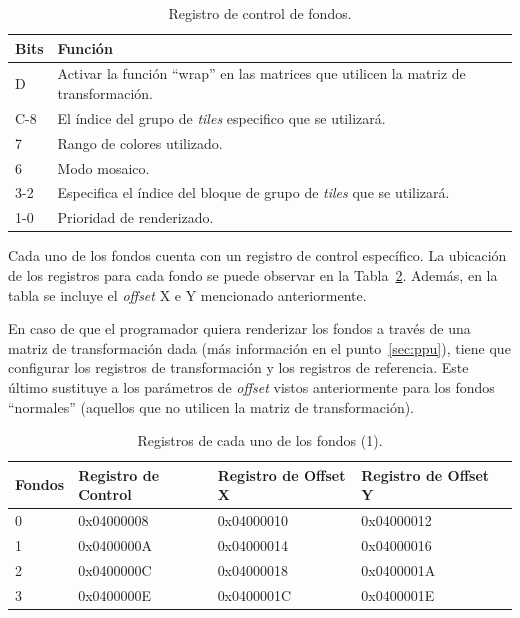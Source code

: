 \begin{table}[h]
	\centering
	\begin{tabular}{| l | l |}
		\hline
		\textbf{Bits} & \textbf{Función}  \\ \hline
		D & Activar la función ``wrap'' en las matrices que utilicen la matriz de transformación. \\ \hline
		C-8 & El índice del grupo de \textit{tiles} especifico que se utilizará.   \\ \hline
		7 & Rango de colores utilizado.  \\ \hline
		6 & Modo mosaico.  \\ \hline
		3-2 & Especifica el índice del bloque de grupo de \textit{tiles} que se utilizará. \\ \hline
		1-0 & Prioridad de renderizado. \\ \hline
	\end{tabular}
	\caption{Registro de control de fondos.}\label{tab:regfondo}
\end{table}
\FloatBarrier{}

Cada uno de los fondos cuenta con un registro de control específico. La ubicación de los registros para cada fondo se puede observar en la Tabla~\ref{tab:fondo_reg_1}. Además, en la tabla se incluye el \textit{offset} X e Y mencionado anteriormente.

En caso de que el programador quiera renderizar los fondos a través de una matriz de transformación dada (más información en el punto~\ref{sec:ppu}), tiene que configurar los registros de transformación y los registros de referencia. Este último sustituye a los parámetros de \textit{offset} vistos anteriormente para los fondos ``normales'' (aquellos que no utilicen la matriz de transformación).

\begin{table}[h]
	\centering
	\begin{tabular}{| l | l | l | l | l |}
		\hline
		\textbf{Fondos} & \textbf{Registro de Control} & \textbf{Registro de Offset X} & \textbf{Registro de Offset Y}  \\ \hline
		0 & 0x04000008 & 0x04000010 & 0x04000012  \\ \hline
		1 & 0x0400000A & 0x04000014 & 0x04000016  \\ \hline
		2 & 0x0400000C & 0x04000018 & 0x0400001A  \\ \hline
		3 & 0x0400000E & 0x0400001C & 0x0400001E  \\ \hline
	\end{tabular}
	\caption{Registros de cada uno de los fondos (1).}\label{tab:fondo_reg_1}
\end{table}
\FloatBarrier{}

